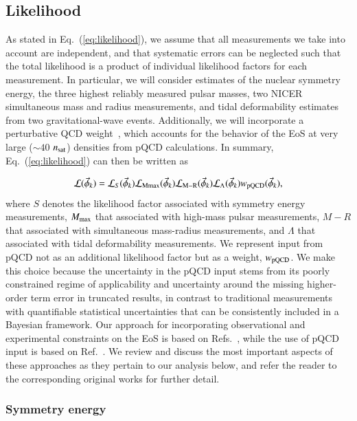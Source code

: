 \documentclass[aps,prd,nofootinbib,tightenlines,notitlepage,floatfix,superscriptaddress,showkeys,twocolumn]{revtex4-1}
\begin{document}
\subsection{Likelihood}
As stated in Eq.~(\ref{eq:likelihood}), we assume that all measurements we take into account are independent, and that systematic errors can be neglected such that the total likelihood is a product of individual likelihood factors for each measurement. In particular, we will consider estimates of the nuclear symmetry energy, the three highest reliably measured pulsar masses, two NICER simultaneous mass and radius measurements, and tidal deformability estimates from two gravitational-wave events. Additionally, we will incorporate a perturbative QCD weight~\cite{Gorda:2022jvk}, which accounts for the behavior of the EoS at very large ($\sim40$ $n_{\rm sat}$) densities from pQCD calculations. In summary, Eq.~(\ref{eq:likelihood}) can then be written as

\begin{equation}
    \mathcal{L}(\vec{\phi}_k)= \mathcal{L}_{S}(\vec{\phi}_k) \mathcal{L}_{\rm Mmax}(\vec{\phi}_k) \mathcal{L}_{\rm M-R}(\vec{\phi}_k)  \mathcal{L}_{\Lambda}(\vec{\phi}_k)w_{\rm pQCD}(\vec{\phi}_k),
\end{equation}
where $S$ denotes the likelihood factor associated with symmetry energy measurements, $M_{\rm max}$ that associated with high-mass pulsar measurements, $M-R$ that associated with simultaneous mass-radius measurements, and $\Lambda$ that associated with tidal deformability measurements. We represent input from pQCD not as an additional likelihood factor but as a weight, $w_{\rm pQCD}$. We make this choice because the uncertainty in the pQCD input stems from its poorly constrained regime of applicability and uncertainty around the missing higher-order term error in truncated results, in contrast to traditional measurements with quantifiable statistical uncertainties that can be consistently included in a Bayesian framework. Our approach for incorporating observational and experimental constraints on the EoS is based on Refs.~\cite{Miller:2019nzo,Miller:2019cac,Miller:2021qha}, while the use of pQCD input is based on Ref.~\cite{Gorda:2022jvk}. We review and discuss the most important aspects of these approaches as they pertain to our analysis below, and refer the reader to the corresponding original works for further detail. 

\subsubsection{Symmetry energy}
\end{document}

